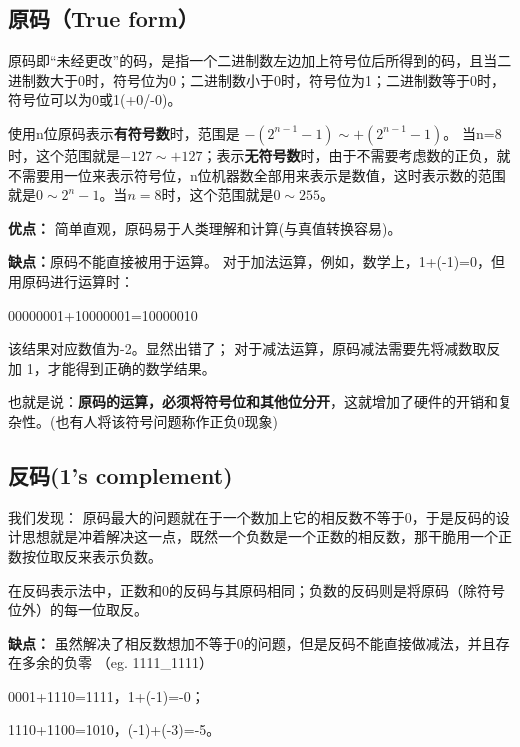 \begin{issues}
\issueDraft
\end{issues}

\subsection{原码（True form）}

原码即“未经更改”的码，是指一个二进制数左边加上符号位后所得到的码，且当二进制数大于0时，符号位为0；二进制数小于0时，符号位为1；二进制数等于0时，符号位可以为0或1(+0/-0)。

使用n位原码表示\textbf{有符号数}时，范围是 $-(2^{n-1}-1)\sim +(2^{n-1}-1)$。 当n=8时，这个范围就是$-127\sim +127 $；表示\textbf{无符号数}时，由于不需要考虑数的正负，就不需要用一位来表示符号位，n位机器数全部用来表示是数值，这时表示数的范围就是$0\sim 2^{n}-1$。当$n=8$时，这个范围就是$0\sim 255$。


\textbf{优点：}
简单直观，原码易于人类理解和计算(与真值转换容易)。

\textbf{缺点：}原码不能直接被用于运算。
对于加法运算，例如，数学上，1+(-1)=0，但用原码进行运算时：


\begin{example}{}
00000001+10000001=10000010
\end{example}


该结果对应数值为-2。显然出错了；
对于减法运算，原码减法需要先将减数取反加 1，才能得到正确的数学结果。

也就是说：\textbf{原码的运算，必须将符号位和其他位分开}，这就增加了硬件的开销和复杂性。(也有人将该符号问题称作正负0现象)


\subsection{反码(1's complement)}

我们发现：
原码最大的问题就在于一个数加上它的相反数不等于0，于是反码的设计思想就是冲着解决这一点，既然一个负数是一个正数的相反数，那干脆用一个正数按位取反来表示负数。

在反码表示法中，正数和0的反码与其原码相同；负数的反码则是将原码（除符号位外）的每一位取反。

\textbf{缺点：}
虽然解决了相反数想加不等于0的问题，但是反码不能直接做减法，并且存在多余的负零 （eg. 1111_1111）

\begin{example}{}
0001+1110=1111，1+(-1)=-0；

1110+1100=1010，(-1)+(-3)=-5。
\end{example}

